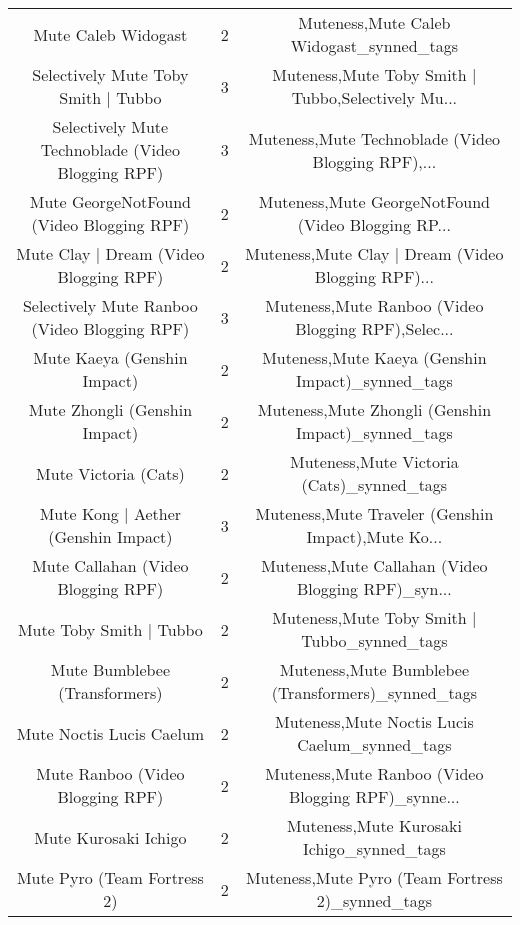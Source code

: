 \begin{table}[h!]
{\begin{tabular}{|c|c|c|}
                               Mute Caleb Widogast &          2 &           Muteness,Mute Caleb Widogast\_synned\_tags \\
               Selectively Mute Toby Smith | Tubbo &          3 & Muteness,Mute Toby Smith | Tubbo,Selectively Mu... \\
 Selectively Mute Technoblade (Video Blogging RPF) &          3 & Muteness,Mute Technoblade (Video Blogging RPF),... \\
          Mute GeorgeNotFound (Video Blogging RPF) &          2 & Muteness,Mute GeorgeNotFound (Video Blogging RP... \\
            Mute Clay | Dream (Video Blogging RPF) &          2 & Muteness,Mute Clay | Dream (Video Blogging RPF)... \\
      Selectively Mute Ranboo (Video Blogging RPF) &          3 & Muteness,Mute Ranboo (Video Blogging RPF),Selec... \\
                       Mute Kaeya (Genshin Impact) &          2 &   Muteness,Mute Kaeya (Genshin Impact)\_synned\_tags \\
                     Mute Zhongli (Genshin Impact) &          2 & Muteness,Mute Zhongli (Genshin Impact)\_synned\_tags \\
                              Mute Victoria (Cats) &          2 &          Muteness,Mute Victoria (Cats)\_synned\_tags \\
               Mute Kong | Aether (Genshin Impact) &          3 & Muteness,Mute Traveler (Genshin Impact),Mute Ko... \\
                Mute Callahan (Video Blogging RPF) &          2 & Muteness,Mute Callahan (Video Blogging RPF)\_syn... \\
                           Mute Toby Smith | Tubbo &          2 &       Muteness,Mute Toby Smith | Tubbo\_synned\_tags \\
                     Mute Bumblebee (Transformers) &          2 & Muteness,Mute Bumblebee (Transformers)\_synned\_tags \\
                          Mute Noctis Lucis Caelum &          2 &      Muteness,Mute Noctis Lucis Caelum\_synned\_tags \\
                  Mute Ranboo (Video Blogging RPF) &          2 & Muteness,Mute Ranboo (Video Blogging RPF)\_synne... \\
                              Mute Kurosaki Ichigo &          2 &          Muteness,Mute Kurosaki Ichigo\_synned\_tags \\
                       Mute Pyro (Team Fortress 2) &          2 &   Muteness,Mute Pyro (Team Fortress 2)\_synned\_tags \\

\end{tabular}}
\end{table}
